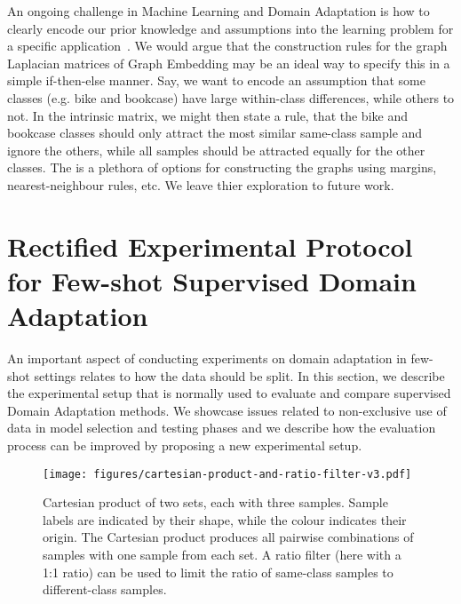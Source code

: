 \documentclass[journal]{IEEEtran}
\begin{document}
An ongoing challenge in Machine Learning and Domain Adaptation is how to clearly encode our prior knowledge and assumptions into the learning problem for a specific application~\cite{kouw2018introduction}.
We would argue that the construction rules for the graph Laplacian matrices of Graph Embedding may be an ideal way to specify this in a simple if-then-else manner. Say, we want to encode an assumption that some classes (e.g. bike and bookcase) have large within-class differences, while others to not. In the intrinsic matrix, we might then state a rule, that the bike and bookcase classes should only attract the most similar same-class sample and ignore the others, while all samples should be attracted equally for the other classes.
The is a plethora of options for constructing the graphs using margins, nearest-neighbour rules, etc. We leave thier exploration to future work.
 \section{Rectified Experimental Protocol for Few-shot Supervised Domain Adaptation} 
\label{sec:rectified-protocol}
An important aspect of conducting experiments on domain adaptation in few-shot settings relates to how the data should be split.
In this section, we describe the experimental setup that is normally used to evaluate and compare supervised Domain Adaptation methods. We showcase issues related to non-exclusive use of data in model selection and testing phases and we describe how the evaluation process can be improved by proposing a new experimental setup.


\begin{figure}[t]
    \centering
    \texttt{[image: figures/cartesian-product-and-ratio-filter-v3.pdf]}
    \caption{Cartesian product of two sets, each with three samples. Sample labels are indicated by their shape, while the colour indicates their origin. The Cartesian product produces all pairwise combinations of samples with one sample from each set. A ratio filter (here with a 1:1 ratio) can be used to limit the ratio of same-class samples to different-class samples.}
    \label{fig:cartesian}
\end{figure}
\end{document}

